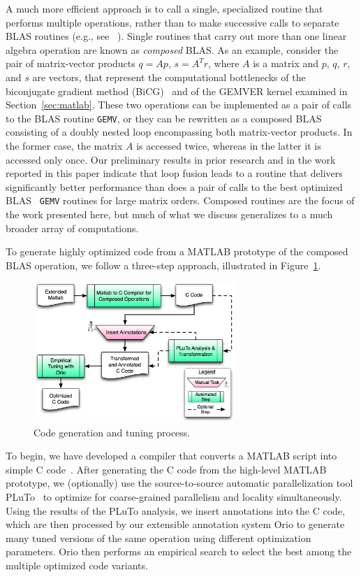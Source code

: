 \documentclass[runningheads]{llncs}
\begin{document}
A much more efficient approach is to call a single, specialized routine that
performs multiple operations, rather than to make successive calls to separate BLAS
routines (e.g., see ~\cite{gropp01}).
Single routines that carry out more than one linear algebra operation are
known as \emph{composed} BLAS. As an example, consider the pair of
matrix-vector products $q = Ap$, $s = A^Tr$, where $A$ is a matrix and $p$,
$q$, $r$, and $s$ are vectors, that represent the computational bottlenecks
of the biconjugate gradient method (BiCG)~\cite{Saad:2003fk} and of the
GEMVER kernel examined in Section~\ref{sec:matlab}.  These two operations can
be implemented as a pair of calls to the BLAS routine {\tt GEMV}, or they can
be rewritten as a composed BLAS consisting of a doubly nested loop
encompassing both matrix-vector products. In the former case, the matrix $A$
is accessed twice, whereas in the latter it is accessed only once. Our
preliminary results in prior research and in the work reported in this paper
indicate that loop fusion leads to a routine that delivers significantly
better performance than does a pair of calls to the best optimized BLAS {\tt
GEMV} routines for large matrix orders.  Composed routines are the focus of
the work presented here, but much of what we discuss generalizes to a much
broader array of computations.

To generate highly optimized code from a MATLAB prototype of the composed
BLAS operation, we follow a three-step approach, illustrated in
Figure~\ref{fig:process}.  
%
\begin{figure}
\vspace{-.2in}
\centering
\includegraphics[width=3in]{figures/process.png}
\caption{Code generation and tuning process.}
\label{fig:process}
\vspace{-.2in}
\end{figure}
%
To begin, we have developed a compiler that
converts a MATLAB script into simple C code~\cite{Siek}.  After generating
the C code from the high-level MATLAB prototype, we (optionally) use 
the source-to-source automatic parallelization tool PLuTo~\cite{Pluto} %
to optimize for coarse-grained parallelism and locality simultaneously. Using
the results of the PLuTo analysis, we insert annotations into the C code,
which are then processed by our extensible annotation system Orio to generate
many tuned versions of the same operation using different optimization
parameters. Orio then performs an empirical search to select the best among
the multiple optimized code variants.
\end{document}
